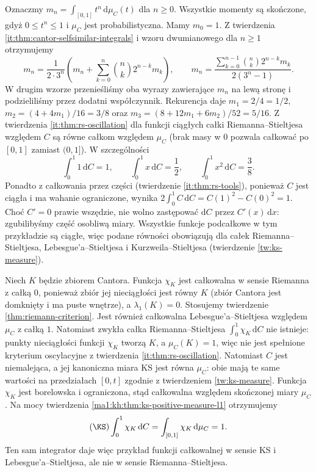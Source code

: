 \begin{przyklad}
\label{it:ex:cantor-moments}
Oznaczmy $m_n=\int_{[0,1]}t^n\,\mathrm d\mu_C(t)$
dla $n\ge0$. Wszystkie momenty są skończone, gdyż
$0\le t^n\le1$ i $\mu_C$ jest probabilistyczna.
Mamy $m_0=1$. Z twierdzenia
\ref{it:thm:cantor-selfsimilar-integrals} i wzoru dwumianowego
dla $n\ge1$ otrzymujemy
\[
 m_n=\frac{1}{2\cdot3^n}
       \left(m_n+\sum_{k=0}^n\binom{n}{k}2^{n-k}m_k\right),
 \qquad
 m_n=\frac{\sum_{k=0}^{n-1}\binom{n}{k}2^{n-k}m_k}
               {2(3^n-1)}.
\]
W drugim wzorze przenieśliśmy oba wyrazy zawierające
$m_n$ na lewą stronę i podzieliliśmy przez dodatni
współczynnik. Rekurencja daje $m_1=2/4=1/2$,
$m_2=(4+4m_1)/16=3/8$ oraz
$m_3=(8+12m_1+6m_2)/52=5/16$.
Z twierdzenia \ref{it:thm:rs-oscillation} dla funkcji
ciągłych całki Riemanna--Stieltjesa względem $C$
są równe całkom względem $\mu_C$ (brak masy w $0$
pozwala całkować po $[0,1]$ zamiast $(0,1]$).
W szczególności
\[
\int_0^1 1\,\mathrm dC=1,\qquad \int_0^1 x\,\mathrm dC=\frac12,\qquad \int_0^1 x^2\,\mathrm dC=\frac38.
\]
Ponadto z całkowania przez części (twierdzenie \ref{it:thm:rs-tools}), ponieważ $C$ jest ciągła i ma wahanie ograniczone, wynika $2\int_0^1 C\,\mathrm dC=C(1)^2-C(0)^2=1$. Choć $C'=0$ prawie wszędzie, nie wolno zastępować $\mathrm dC$ przez $C'(x)\,\mathrm dx$: zgubilibyśmy część osobliwą miary. Wszystkie funkcje podcałkowe w tym przykładzie są
ciągłe, więc podane równości obowiązują dla całek
Riemanna--Stieltjesa, Lebesgue'a--Stieltjesa i
Kurzweila--Stieltjesa (twierdzenie \ref{tw:ks-measure}).
\end{przyklad}
\begin{przyklad}
Niech $K$ będzie zbiorem Cantora. Funkcja $\chi_K$ jest całkowalna w sensie Riemanna z całką $0$, ponieważ zbiór jej nieciągłości jest równy $K$ (zbiór Cantora jest domknięty i ma puste wnętrze), a $\lambda_1(K)=0$. Stosujemy twierdzenie \ref{thm:riemann-criterion}. Jest również całkowalna Lebesgue'a--Stieltjesa względem $\mu_C$ z całką $1$. Natomiast zwykła całka Riemanna--Stieltjesa $\int_0^1\chi_K\,\mathrm dC$ nie istnieje: punkty nieciągłości funkcji $\chi_K$ tworzą $K$, a $\mu_C(K)=1$, więc nie jest spełnione kryterium oscylacyjne z twierdzenia \ref{it:thm:rs-oscillation}.
Natomiast $C$ jest niemalejąca, a jej kanoniczna miara
KS jest równa $\mu_C$: obie mają te same wartości
na przedziałach $[0,t]$ zgodnie z twierdzeniem
\ref{tw:ks-measure}. Funkcja $\chi_K$ jest borelowska
i ograniczona, stąd całkowalna względem skończonej
miary $\mu_C$. Na mocy twierdzenia
\ref{ma1:kh:thm:ks-positive-measure-l1} otrzymujemy
\[
 (\KS)\int_0^1\chi_K\,\mathrm dC
 =\int_{[0,1]}\chi_K\,\mathrm d\mu_C=1.
\]
Ten sam integrator daje więc przykład funkcji
całkowalnej w sensie KS i Lebesgue'a--Stieltjesa,
ale nie w sensie Riemanna--Stieltjesa.
\end{przyklad}

